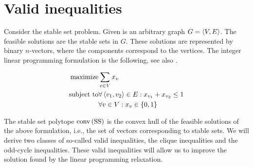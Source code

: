 \documentclass[titlepage]{book}
\theoremstyle{plain}
\theoremstyle{definition}
\theoremstyle{remark}
\begin{document}
\section{Valid inequalities}
Consider the stable set problem. Given is an arbitrary graph $G=\left\langle V,E \right\rangle$. The feasible solutions are the stable sets in $G$. These solutions are represented by binary $n$-vectors, where the components correspond to the vertices. The integer linear programming formulation is the following, see also .

\begin{eqnarray}
\mbox{maximize}&\sumdomain[v]{V}{x_v}\eqnlab{stablesetr-m}\\
\mbox{subject to}&\forall\tupl{v_1,v_2}\in E:x_{v_1}+x_{v_2}\leq 1\eqnlab{stablesetr-c1}\\
&\forall v\in V:x_v\in\accl{0,1}\eqnlab{stablesetr-c2}
\end{eqnarray}

The stable set polytope $\mbox{conv}\left( \mbox{SS} \right)$ is the convex hull of the feasible solutions of the above formulation, i.e., the set of vectors corresponding to stable sets. We will derive two classes of so-called valid inequalities, the clique inequalities and the odd-cycle inequalities. These valid inequalities will allow us to improve the solution found by the linear programming relaxation.
\end{document}
